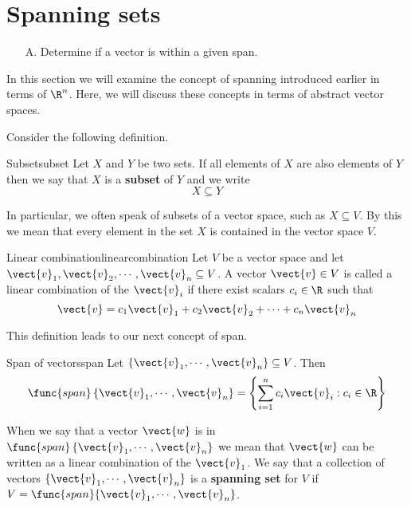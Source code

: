\section{Spanning sets}

\begin{outcome}
\begin{enumerate}
\item[A.] Determine if a vector is within a given span.
\end{enumerate}
\end{outcome}

In this section we will examine the concept of spanning introduced earlier in terms of $\R^n$. Here, we will discuss these concepts in terms of abstract vector spaces. 

Consider the following definition. 

\begin{definition}{Subset}{subset}
Let $X$ and $Y$ be two sets. If all elements of $X$ are also elements of $Y$ then we say that $X$ is a \textbf{subset} of $Y$ and we write
\[
X \subseteq Y
\]
\end{definition}

In particular, we often speak of subsets of a vector space, such as $X \subseteq V$. By this we mean that every element in the set $X$ is contained in the vector space $V$. 

\begin{definition}{Linear combination}{linearcombination}
Let $V$ be a vector space and let $\vect{v}_1, \vect{v}_2, \cdots, \vect{v}_n \subseteq V$. A vector $\vect{v} \in V$ is called a linear combination of the $\vect{v}_i$ if there exist scalars $c_i \in \R$ such that 
\[
\vect{v} = c_1 \vect{v}_1 + c_2 \vect{v}_2 + \cdots + c_n \vect{v}_n
\]
\end{definition}

This definition leads to our next concept of span.

\begin{definition}{Span of vectors}{span}
Let $\{\vect{v}_{1},\cdots ,\vect{v}_{n}\} \subseteq V$. Then
\begin{equation*}
\func{span}\left\{ \vect{v}_{1},\cdots ,\vect{v}_{n}\right\} = 
\left\{ \sum_{i=1}^{n}c_{i}\vect{v}_{i}: c_{i}\in \R
\right\} 
\end{equation*}
\end{definition}

When we say that a vector $\vect{w}$ is in $\func{span}\left\{ \vect{v}_{1},\cdots ,\vect{v}_{n}\right\}$ we mean that $\vect{w}$ can be written as a linear combination of the $\vect{v}_1$. We say that a collection of vectors $\{\vect{v}_{1},\cdots ,\vect{v}_{n}\}$ is a \textbf{spanning set} for $V$ if $V = \func{span} \{\vect{v}_{1},\cdots ,\vect{v}_{n}\}$. 

